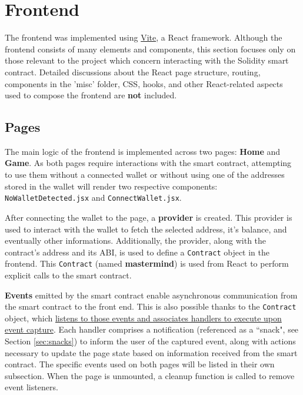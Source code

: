 
\section{Frontend}

The frontend was implemented using \href{https://vitejs.dev/}{Vite}, a React framework. Although the frontend consists of many elements and components, this section focuses only on those relevant to the project which concern interacting with the Solidity smart contract.
Detailed discussions about the React page structure, routing, components in the 'misc' folder, CSS, hooks, and other React-related aspects used to compose the frontend are \textbf{not} included.

\subsection{Pages}
\label{sec:pages}

The main logic of the frontend is implemented across two pages: \textbf{Home} and \textbf{Game}. As both pages require interactions with the smart contract, attempting to use them without a connected wallet or without using one of the addresses stored in the wallet will render two respective components: \texttt{NoWalletDetected.jsx} and \texttt{ConnectWallet.jsx}.

After connecting the wallet to the page, a \textbf{provider} is created. This provider is used to interact with the wallet to fetch the selected address, it's balance, and eventually other informations. Additionally, the provider, along with the contract's address and its ABI, is used to define a \texttt{Contract} object in the frontend. This \texttt{Contract} (named \textbf{mastermind}) is used from React to perform explicit calls to the smart contract.

\textbf{Events} emitted by the smart contract enable asynchronous communication from the smart contract to the front end. 
This is also possible thanks to the \texttt{Contract} object, which \ul{listens to those events and associates handlers to execute upon event capture}. Each handler comprises a notification (referenced as a ``snack", see Section \ref{sec:snacks}) to inform the user of the captured event, along with actions necessary to update the page state based on information received from the smart contract. The specific events used on both pages will be listed in their own subsection. When the page is unmounted, a cleanup function is called to remove event listeners.

